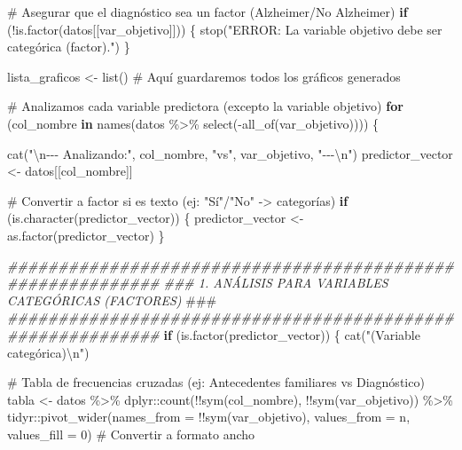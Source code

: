 \documentclass[
  letterpaper,
  DIV=11,
  numbers=noendperiod]{scrartcl}
\newenvironment{Shaded}{\begin{snugshade}}{\end{snugshade}}
\newcommand{\AlertTok}[1]{\textcolor[rgb]{0.68,0.00,0.00}{#1}}
\newcommand{\AttributeTok}[1]{\textcolor[rgb]{0.40,0.45,0.13}{#1}}
\newcommand{\CommentTok}[1]{\textcolor[rgb]{0.37,0.37,0.37}{#1}}
\newcommand{\ControlFlowTok}[1]{\textcolor[rgb]{0.00,0.23,0.31}{\textbf{#1}}}
\newcommand{\DecValTok}[1]{\textcolor[rgb]{0.68,0.00,0.00}{#1}}
\newcommand{\DocumentationTok}[1]{\textcolor[rgb]{0.37,0.37,0.37}{\textit{#1}}}
\newcommand{\FunctionTok}[1]{\textcolor[rgb]{0.28,0.35,0.67}{#1}}
\newcommand{\NormalTok}[1]{\textcolor[rgb]{0.00,0.23,0.31}{#1}}
\newcommand{\OtherTok}[1]{\textcolor[rgb]{0.00,0.23,0.31}{#1}}
\newcommand{\SpecialCharTok}[1]{\textcolor[rgb]{0.37,0.37,0.37}{#1}}
\newcommand{\StringTok}[1]{\textcolor[rgb]{0.13,0.47,0.30}{#1}}
\begin{document}
\begin{Shaded}
\begin{Highlighting}[]
  \CommentTok{\# Asegurar que el diagnóstico sea un factor (Alzheimer/No Alzheimer)}
  \ControlFlowTok{if}\NormalTok{ (}\SpecialCharTok{!}\FunctionTok{is.factor}\NormalTok{(datos[[var\_objetivo]])) \{}
    \FunctionTok{stop}\NormalTok{(}\StringTok{"ERROR: La variable objetivo debe ser categórica (factor)."}\NormalTok{)}
\NormalTok{  \}}

\NormalTok{  lista\_graficos }\OtherTok{\textless{}{-}} \FunctionTok{list}\NormalTok{()  }\CommentTok{\# Aquí guardaremos todos los gráficos generados}
  
  \CommentTok{\# Analizamos cada variable predictora (excepto la variable objetivo)}
  \ControlFlowTok{for}\NormalTok{ (col\_nombre }\ControlFlowTok{in} \FunctionTok{names}\NormalTok{(datos }\SpecialCharTok{\%\textgreater{}\%} \FunctionTok{select}\NormalTok{(}\SpecialCharTok{{-}}\FunctionTok{all\_of}\NormalTok{(var\_objetivo)))) \{}
    
    \FunctionTok{cat}\NormalTok{(}\StringTok{"}\SpecialCharTok{\textbackslash{}n}\StringTok{{-}{-}{-} Analizando:"}\NormalTok{, col\_nombre, }\StringTok{"vs"}\NormalTok{, var\_objetivo, }\StringTok{"{-}{-}{-}}\SpecialCharTok{\textbackslash{}n}\StringTok{"}\NormalTok{)}
\NormalTok{    predictor\_vector }\OtherTok{\textless{}{-}}\NormalTok{ datos[[col\_nombre]]}
    
    \CommentTok{\# Convertir a factor si es texto (ej: "Sí"/"No" {-}\textgreater{} categorías)}
    \ControlFlowTok{if}\NormalTok{ (}\FunctionTok{is.character}\NormalTok{(predictor\_vector)) \{ }
\NormalTok{      predictor\_vector }\OtherTok{\textless{}{-}} \FunctionTok{as.factor}\NormalTok{(predictor\_vector)}
\NormalTok{    \}}

    \DocumentationTok{\#\#\#\#\#\#\#\#\#\#\#\#\#\#\#\#\#\#\#\#\#\#\#\#\#\#\#\#\#\#\#\#\#\#\#\#\#\#\#\#\#\#\#\#\#\#\#\#\#\#\#\#\#\#\#\#\#\#\#}
    \DocumentationTok{\#\#\# 1. ANÁLISIS PARA VARIABLES CATEGÓRICAS (FACTORES) }\AlertTok{\#\#\#}
    \DocumentationTok{\#\#\#\#\#\#\#\#\#\#\#\#\#\#\#\#\#\#\#\#\#\#\#\#\#\#\#\#\#\#\#\#\#\#\#\#\#\#\#\#\#\#\#\#\#\#\#\#\#\#\#\#\#\#\#\#\#\#\#}
    \ControlFlowTok{if}\NormalTok{ (}\FunctionTok{is.factor}\NormalTok{(predictor\_vector)) \{}
      \FunctionTok{cat}\NormalTok{(}\StringTok{"(Variable categórica)}\SpecialCharTok{\textbackslash{}n}\StringTok{"}\NormalTok{)}
      
      \CommentTok{\# Tabla de frecuencias cruzadas (ej: Antecedentes familiares vs Diagnóstico)}
\NormalTok{      tabla }\OtherTok{\textless{}{-}}\NormalTok{ datos }\SpecialCharTok{\%\textgreater{}\%}
\NormalTok{        dplyr}\SpecialCharTok{::}\FunctionTok{count}\NormalTok{(}\SpecialCharTok{!!}\FunctionTok{sym}\NormalTok{(col\_nombre), }\SpecialCharTok{!!}\FunctionTok{sym}\NormalTok{(var\_objetivo)) }\SpecialCharTok{\%\textgreater{}\%}
\NormalTok{        tidyr}\SpecialCharTok{::}\FunctionTok{pivot\_wider}\NormalTok{(}\AttributeTok{names\_from =} \SpecialCharTok{!!}\FunctionTok{sym}\NormalTok{(var\_objetivo), }
                          \AttributeTok{values\_from =}\NormalTok{ n, }
                          \AttributeTok{values\_fill =} \DecValTok{0}\NormalTok{)  }\CommentTok{\# Convertir a formato ancho}
      

\end{Highlighting}
\end{Shaded}
\end{document}
